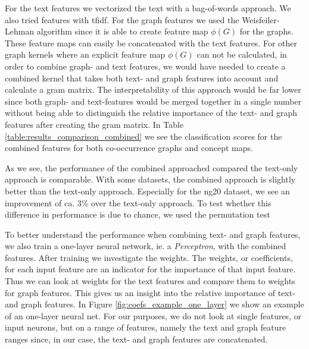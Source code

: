 For the text features we vectorized the text with a bag-of-words approach. We also tried features with tfidf.
For the graph features we used the Weisfeiler-Lehman algorithm since it is able to create feature map $\phi(G)$ for the graphs.
These feature maps can easily be concatenated with the text features.
For other graph kernels where an explicit feature map $\phi(G)$ can not be calculated, in order to combine graph- and text features, we would have needed to create a combined kernel that takes both text- and graph features into account and calculate a gram matrix.
The interpretability of this approach would be far lower since both graph- and text-features would be merged together in a single number without being able to distinguish the relative importance of the text- and graph features after creating the gram matrix.
In Table \ref{table:results_comparison_combined} we see the classification scores for the combined features for both co-occurrence graphs and concept maps.

As we see, the performance of the combined approached compared the text-only approach is comparable.
With some datasets, the combined approach is slightly better than the text-only approach. Especially for the ng20 dataset, we see an improvement of ca. 3\% over the text-only approach.
To test whether this difference in performance is due to chance, we used the permutation test

To better understand the performance when combining text- and graph features, we also train a one-layer neural network, ie. a \textit{Perceptron}, with the combined features. After training we investigate the weights.
The weights, or coefficients, for each input feature are an indicator for the importance of that input feature.
Thus we can look at weights for the text features and compare them to weights for graph features.
This gives us an insight into the relative importance of text- and graph features.
In Figure \ref{fig:coefs_example_one_layer} we show an example of an one-layer neural net.
For our purposes, we do not look at single features, or input neurons, but on a range of features, namely the text and graph feature ranges since, in our case, the text- and graph features are concatenated.

